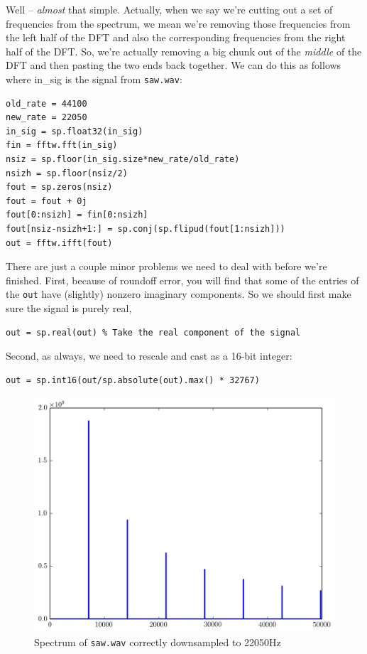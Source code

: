 Well -- \emph{almost} that simple. Actually, when we say we're cutting out a set of frequencies from the spectrum, we mean we're removing those frequencies from the left half of the DFT and also the corresponding frequencies from the right half of the DFT. So, we're actually removing a big chunk out of the \emph{middle} of the DFT and then pasting the two ends back together. We can do this as follows where in\_sig is the signal from \texttt{saw.wav}:
\begin{lstlisting}
old_rate = 44100
new_rate = 22050
in_sig = sp.float32(in_sig)
fin = fftw.fft(in_sig)
nsiz = sp.floor(in_sig.size*new_rate/old_rate)
nsizh = sp.floor(nsiz/2)
fout = sp.zeros(nsiz)
fout = fout + 0j
fout[0:nsizh] = fin[0:nsizh]
fout[nsiz-nsizh+1:] = sp.conj(sp.flipud(fout[1:nsizh]))
out = fftw.ifft(fout)
\end{lstlisting}
There are just a couple minor problems we need to deal with before we're finished. First, because of roundoff error, you will find that some of the entries of the \texttt{out} have (slightly) nonzero imaginary components.  So we should first make sure the signal is purely real,
\begin{lstlisting}
out = sp.real(out) % Take the real component of the signal
\end{lstlisting}
Second, as always, we need to rescale and cast as a 16-bit integer:
\begin{lstlisting}
out = sp.int16(out/sp.absolute(out).max() * 32767)
\end{lstlisting}


\begin{figure}[ht]\caption{Spectrum of \texttt{saw.wav} correctly downsampled to 22050Hz}\label{sawspecdown2}\centering\includegraphics[width=\textwidth]{sawdownspec}\end{figure}

